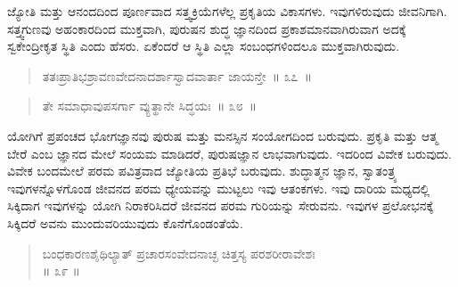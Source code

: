 \vspace{-0.4cm}


\vfill\eject

ಜ್ಯೋತಿ ಮತ್ತು ಆನಂದದಿಂದ ಪೂರ್ಣವಾದ ಸತ್ತ್ವಕ್ರಿಯೆಗಳೆಲ್ಲ ಪ್ರಕೃತಿಯ ವಿಕಾಸಗಳು. ಇವುಗಳಿರುವುದು ಜೀವನಿಗಾಗಿ. ಸತ್ತ್ವಗುಣವು ಅಹಂಕಾರದಿಂದ ಮುಕ್ತವಾಗಿ, ಪುರುಷನ ಶುದ್ಧ ಜ್ಞಾನದಿಂದ ಪ್ರಕಾಶಮಾನವಾಗಿರುವಾಗ ಅದಕ್ಕೆ ಸ್ವಕೇಂದ್ರೀಕೃತ ಸ್ಥಿತಿ ಎಂದು ಹೆಸರು. ಏಕೆಂದರೆ ಆ ಸ್ಥಿತಿ ಎಲ್ಲಾ ಸಂಬಂಧಗಳಿಂದಲೂ ಮುಕ್ತವಾಗಿರುವುದು. 


\begin{verse}
ತತಃಪ್ರಾತಿಭಶ್ರಾವಣವೇದನಾದರ್ಶಾಸ್ವಾದವಾರ್ತಾ ಜಾಯನ್ತೇ~॥ ೩೭~॥
\end{verse}

\vspace{-0.3cm}




\begin{verse}
ತೇ ಸಮಾಧಾವುಪಸರ್ಗಾ ವ್ಯುತ್ಥಾನೇ ಸಿದ್ಧಯಃ~॥ ೩೮~॥
\end{verse}

\vspace{-0.3cm}


\vspace{0.2cm}

ಯೋಗಿಗೆ ಪ್ರಪಂಚದ ಭೋಗಜ್ಞಾನವು ಪುರುಷ ಮತ್ತು ಮನಸ್ಸಿನ ಸಂಯೋಗದಿಂದ ಬರುವುದು. ಪ್ರಕೃತಿ ಮತ್ತು ಆತ್ಮ ಬೇರೆ ಎಂಬ ಜ್ಞಾನದ ಮೇಲೆ ಸಂಯಮ ಮಾಡಿದರೆ, ಪುರುಷಜ್ಞಾನ ಲಾಭವಾಗುವುದು. ಇದರಿಂದ ವಿವೇಕ ಬರುವುದು. ವಿವೇಕ ಬಂದಮೇಲೆ ಪರಮ ಪವಿತ್ರವಾದ ಜ್ಯೋತಿಯ ಪ್ರತಿಭೆ ಬರುವುದು. ಶುದ್ಧಾತ್ಮನ ಜ್ಞಾನ, ಸ್ವಾತಂತ್ರ್ಯ ಇವುಗಳನ್ನೊಳಗೊಂಡ ಜೀವನದ ಪರಮ ಧ್ಯೇಯವನ್ನು ಮುಟ್ಟಲು ಇವು ಆತಂಕಗಳು. ಇವು ದಾರಿಯ ಮಧ್ಯದಲ್ಲಿ ಸಿಕ್ಕಿದಾಗ ಇವುಗಳನ್ನು ಯೋಗಿ ನಿರಾಕರಿಸಿದರೆ ಜೀವನದ ಪರಮ ಗುರಿಯನ್ನು ಸೇರುವನು. ಇವುಗಳ ಪ್ರಲೋಭನಕ್ಕೆ ಸಿಕ್ಕಿದರೆ ಅವನು ಮುಂದುವರಿಯುವುದು ಕೊನೆಗೊಂಡಂತೆಯೆ. 


\begin{verse}
ಬಂಧಕಾರಣಶೈಥಿಲ್ಯಾತ್​ ಪ್ರಚಾರಸಂವೇದನಾಚ್ಛ ಚಿತ್ತಸ್ಯ ಪರಶರೀರಾವೇಶಃ\\\hfill ॥ ೩೯ ॥
\end{verse}

\vspace{-0.3cm}


